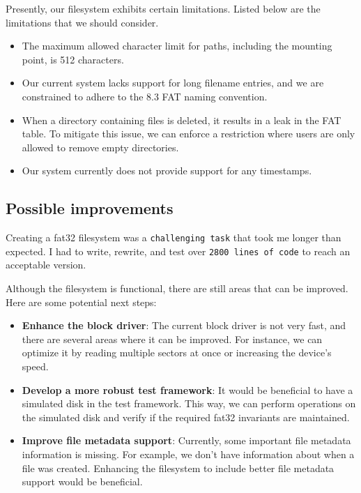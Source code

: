 {Presently, our filesystem exhibits certain limitations. Listed below are the limitations that we should consider.

\begin{itemize}
    \item The maximum allowed character limit for paths, including the mounting point, is 512 characters.

    \item Our current system lacks support for long filename entries, and we are constrained to adhere to the 8.3 FAT naming convention.

    \item When a directory containing files is deleted, it results in a leak in the FAT table. To mitigate this issue, we can enforce a restriction where users are only allowed to remove empty directories.

    \item Our system currently does not provide support for any timestamps.
\end{itemize}


\subsection{Possible improvements}

Creating a fat32 filesystem was a \texttt{challenging task} that took me longer than expected. I had to write, rewrite, and test over \texttt{2800 lines of code} to reach an acceptable version.

Although the filesystem is functional, there are still areas that can be improved. Here are some potential next steps:

\begin{itemize}
    \item \textbf{Enhance the block driver}: The current block driver is not very fast, and there are several areas where it can be improved. For instance, we can optimize it by reading multiple sectors at once or increasing the device's speed.

    \item \textbf{Develop a more robust test framework}: It would be beneficial to have a simulated disk in the test framework. This way, we can perform operations on the simulated disk and verify if the required fat32 invariants are maintained.

    \item \textbf{Improve file metadata support}: Currently, some important file metadata information is missing. For example, we don't have information about when a file was created. Enhancing the filesystem to include better file metadata support would be beneficial.


\end{itemize}}
